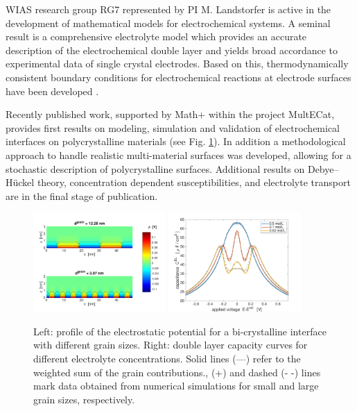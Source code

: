 \documentclass[a4paper,10pt]{article}
\begin{document}
WIAS research group RG7 represented by PI M. Landstorfer is active in the development of mathematical models for electrochemical systems.  A seminal result is a comprehensive electrolyte model which provides an accurate description of the electrochemical double layer and yields broad accordance to experimental data of single crystal electrodes. Based on this, thermodynamically consistent boundary conditions for electrochemical reactions at electrode surfaces have been developed \cite{DGM2013,DGL2014,Landstorfer2016187,landstorfer2017boundary}.

Recently published work\cite{JES}, supported by Math+ within the project MultECat, provides first results on modeling, simulation and validation of electrochemical interfaces on polycrystalline materials (see Fig. \ref{fig:JES}). In addition a methodological approach to handle realistic multi-material surfaces was developed, allowing for a stochastic description of polycrystalline surfaces. Additional results on Debye--Hückel theory, concentration dependent susceptibilities, and electrolyte transport are in the final stage of publication. %

\begin{figure}
  \centering
  \includegraphics[width=0.45\textwidth]{phi_poly2d_gran.pdf}
  \includegraphics[width=0.45\textwidth]{c_2d_grain.pdf}
  \caption{Left: profile of the electrostatic potential for a bi-crystalline interface with different
    grain sizes.
    Right: double layer capacity curves for different electrolyte concentrations.
    Solid lines (—) refer to the weighted sum of the grain contributions.,
    (+) and dashed (- -) lines mark data obtained from numerical simulations for
    small and large grain sizes, respectively.
 \label{fig:JES}}
\end{figure}
\end{document}
